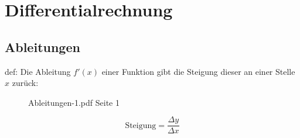 \chapter{Differentialrechnung}
\section{Ableitungen}

def: Die Ableitung \(f'(x)\) einer Funktion gibt die Steigung dieser an einer Stelle \(x\) zurück:
\begin{figure}[H]
    \centering
    \label{figEmpty}
    \caption{Ableitungen-1.pdf Seite 1}
\end{figure}
\begin{equation}
    \text{Steigung} = \frac{\Delta y}{\Delta x}
\end{equation}


